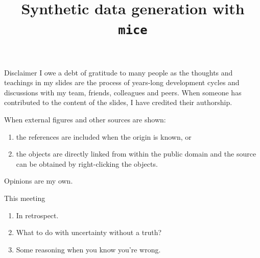 \documentclass[
  ignorenonframetext,
]{beamer}
\title{Synthetic data generation with \texttt{mice}}
\author{}
\date{}
\providecommand{\tightlist}{%
  \setlength{\itemsep}{0pt}\setlength{\parskip}{0pt}}\usepackage{longtable,booktabs,array}
\begin{document}
\frame{\titlepage}
\ifdefined\Shaded\renewenvironment{Shaded}{\begin{tcolorbox}[boxrule=0pt, borderline west={3pt}{0pt}{shadecolor}, enhanced, sharp corners, frame hidden, breakable, interior hidden]}{\end{tcolorbox}}\fi

\begin{frame}
\end{frame}

\begin{frame}{Disclaimer}
\protect\hypertarget{disclaimer}{}
I owe a debt of gratitude to many people as the thoughts and teachings
in my slides are the process of years-long development cycles and
discussions with my team, friends, colleagues and peers. When someone
has contributed to the content of the slides, I have credited their
authorship.

When external figures and other sources are shown:

\begin{enumerate}
[1)]
\tightlist
\item
  the references are included when the origin is known, or
\item
  the objects are directly linked from within the public domain and the
  source can be obtained by right-clicking the objects.
\end{enumerate}

Opinions are my own.
\end{frame}

\begin{frame}{This meeting}
\protect\hypertarget{this-meeting}{}
\begin{enumerate}
\tightlist
\item
  In retrospect.
\item
  What to do with uncertainty without a truth?
\item
  Some reasoning when you know you're wrong.
\end{enumerate}
\end{frame}
\end{document}
